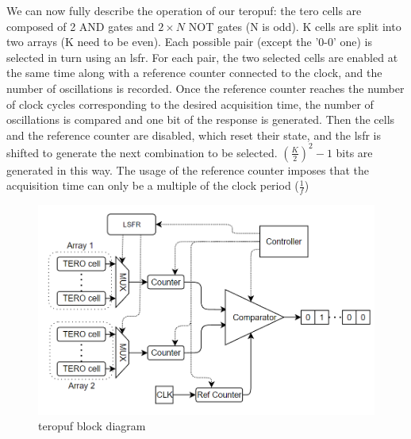 We can now fully describe the operation of our \acrshort{teropuf}: the \acrshort{tero} cells are composed of 2 AND gates and $2\times N$ NOT gates (N is odd). K cells are split into two arrays (K need to be even). Each possible pair (except the '0-0' one) is selected in turn using an \acrshort{lsfr}. For each pair, the two selected cells are enabled at the same time along with a reference counter connected to the clock, and the number of oscillations is recorded. Once the reference counter reaches the number of clock cycles corresponding to the desired acquisition time, the number of oscillations is compared and one bit of the response is generated. Then the cells and the reference counter are disabled, which reset their state, and the \acrshort{lsfr} is shifted to generate the next combination to be selected. $\left ( \frac{K}{2}\right )^2 -1$ bits are generated in this way. The usage of the reference counter imposes that the acquisition time can only be a multiple of the clock period ($\frac{1}{f}$)\\


\begin{figure}[H]
    \centering
    \includegraphics[width=1\linewidth]{images/puf_block.png}
    \caption{\acrshort{teropuf} block diagram}
    \label{fig:generative_sum}
\end{figure}

